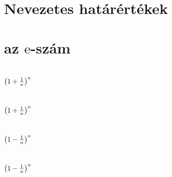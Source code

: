 








\begin{spacing}{1.2}
\pagecolor{BGSZ}

\section*{Nevezetes határértékek} \label{DB}
\newline
{}
\newline
{}
\newpage
\section*{az $\mathrm{e}$-szám} \label{DBe}
\newline
{}
\newline
{}
\newline
{}
\vspace{0.5cm}
\newpage
\section*{${ \left( 1+\frac{1}{n} \right) }^n$} \label{DBe1}
\Fa{

}
\vspace{0.5cm}
\newpage
\section*{${ \left( 1+\frac{1}{n} \right) }^n$} \label{DBe1Mo}
\Mo{

}
\vspace{0.5cm}
\newpage
\section*{${ \left( 1-\frac{1}{n} \right) }^n$} \label{DBe2}
\Fa{

}
\vspace{0.5cm}
\newpage
\section*{${ \left( 1-\frac{1}{n} \right) }^n$} \label{DBe2Mo}
\Mo{

}
\vspace{0.5cm}
\newpage

\end{spacing}

